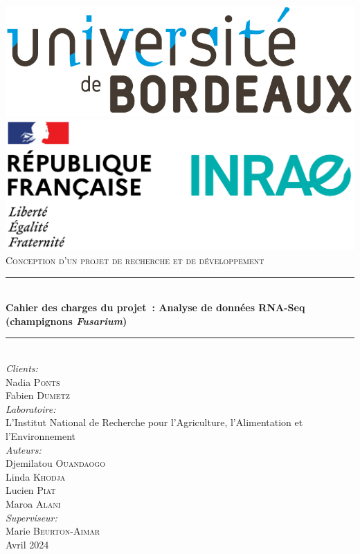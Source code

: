 \documentclass{report}
\begin{document}
\begin{titlepage}

\newcommand{\reportyear}{Avril 2024}
\newcommand{\HRule}{\rule{\linewidth}{0.5mm}} %
\center %
\includegraphics[scale=0.3]{Images/logo_ub.png}\\[0,5cm] %
\includegraphics[scale=0.4]{Images/logo_inrae.PNG}\\[1cm] %
\textsc{\Large Conception d'un projet de recherche et de développement}\\[0.5cm] %
\HRule \\[0.4cm]
{ \huge \bfseries Cahier des charges du projet : Analyse de données RNA-Seq (champignons \textit{Fusarium})}\\[0.3cm] %
\HRule \\[0,8cm]

\Large \emph{Clients:}\\
Nadia \textsc{Ponts}\\
Fabien \textsc{Dumetz}\\[0,8cm]

\Large \emph{Laboratoire:}\\
L’Institut National de Recherche pour l’Agriculture, l’Alimentation et l’Environnement\\[0,8cm]

\Large \emph{Auteurs:}\\
Djemilatou \textsc{Ouandaogo}\\
Linda \textsc{Khodja}\\
Lucien \textsc{Piat}\\
Maroa \textsc{Alani}\\[0,8cm]

\Large \emph{Superviseur:}\\
 Marie \textsc{Beurton-Aimar}\\[1cm]
\reportyear

\vfill %
\end{titlepage}
\end{document}
